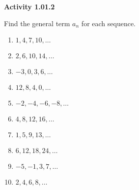 \vspace{0.3ex}
\noindent\textbf{Activity 1.01.2}

\vspace{0.2ex}

Find the general term $a_n$ for each sequence.
\begin{multicols}{2}
\begin{enumerate}
    \item $1, 4, 7, 10, \dots$
    \item $2, 6, 10, 14, \dots$
    \item $-3, 0, 3, 6, \dots$
    \item $12, 8, 4, 0, \dots$
    \item $-2, -4, -6, -8, \dots$
    \item $4, 8, 12, 16, \dots$
    \item $1, 5, 9, 13, \dots$
    \item $6, 12, 18, 24, \dots$
    \item $-5, -1, 3, 7, \dots$
    \item $2, 4, 6, 8, \dots$
    \end{enumerate}
    \end{multicols}
